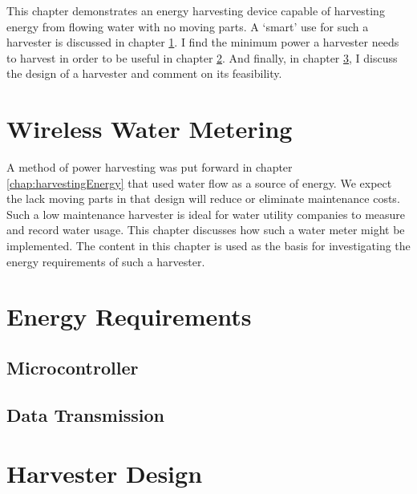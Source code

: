        This chapter demonstrates an energy harvesting device capable of harvesting energy from flowing water with no moving parts.
        A `smart' use for such a harvester is discussed in chapter \ref{chap:wirelessWaterMetering}.
        I find the minimum power a harvester needs to harvest in order to be useful in chapter \ref{chap:energyRequirements}.
        And finally, in chapter \ref{chap:harvesterDesign}, I discuss the design of a harvester and comment on its feasibility.

        

    \chapter{Wireless Water Metering}
        \label{chap:wirelessWaterMetering}

        A method of power harvesting was put forward in chapter \ref{chap:harvestingEnergy} that used water flow as a source of energy.
        We expect the lack moving parts in that design will reduce or eliminate maintenance costs.
        Such a low maintenance harvester is ideal for water utility companies to measure and record water usage.
        This chapter discusses how such a water meter might be implemented.
        The content in this chapter is used as the basis for investigating the energy requirements of such a harvester.

        

    \chapter{Energy Requirements}
        \label{chap:energyRequirements}
        
        \section{Microcontroller}
            
        
        \section{Data Transmission}
            

    \chapter{Harvester Design}
        \label{chap:harvesterDesign}
        

